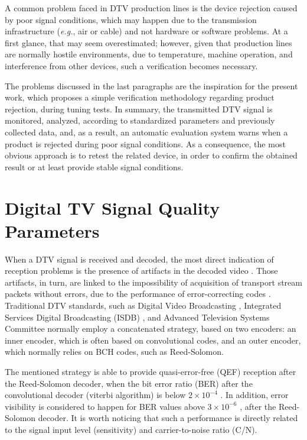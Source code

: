 \documentclass[conference]{IEEEtran}
\begin{document}
A common problem faced in DTV production lines is the device rejection caused by poor signal conditions, which may happen due to the transmission infrastructure ({\it e.g.}, air or cable) and not hardware or software problems. At a first glance, that may seem overestimated; however, given that production lines are normally hostile environments, due to temperature, machine operation, and interference from other devices, such a verification becomes necessary.

The problems discussed in the last paragraphs are the inspiration for the present work, which proposes a simple verification methodology regarding product rejection, during tuning tests. In summary, the transmitted DTV signal is monitored, analyzed, according to standardized parameters and previously collected data, and, as a result, an automatic evaluation system warns when a product is rejected during poor signal conditions. As a consequence, the most obvious approach is to retest the related device, in order to confirm the obtained result or at least provide stable signal conditions. %

\section{Digital TV Signal Quality Parameters}\label{measure}
When a DTV signal is received and decoded, the most direct indication of reception problems is the presence of artifacts in the decoded video \cite{keith}. Those artifacts, in turn, are linked to the impossibility of acquisition of transport stream packets \cite{reimers,iso13818_1} without errors, due to the performance of error-correcting codes \cite{keith,reimers}. Traditional DTV standards, such as Digital Video Broadcasting \cite{dvb}, Integrated Services Digital Broadcasting (ISDB) \cite{isdb}, and Advanced Television Systems Committee \cite{atsc} normally employ a concatenated strategy, based on two encoders: an inner encoder, which is often based on convolutional codes, and an outer encoder, which normally relies on BCH codes, such as Reed-Solomon.

The mentioned strategy is able to provide quasi-error-free (QEF) reception after the Reed-Solomon decoder, when the bit error ratio (BER) after the convolutional decoder (viterbi algorithm) is below $2\times 10^{-4}$ \cite{dvb}. In addition, error visibility is considered to happen for BER values above $3\times 10^{-6}$ \cite{fcc}, after the Reed-Solomon decoder. It is worth noticing that such a performance is directly related to the signal input level (sensitivity) and carrier-to-noise ratio (C/N).
\end{document}
